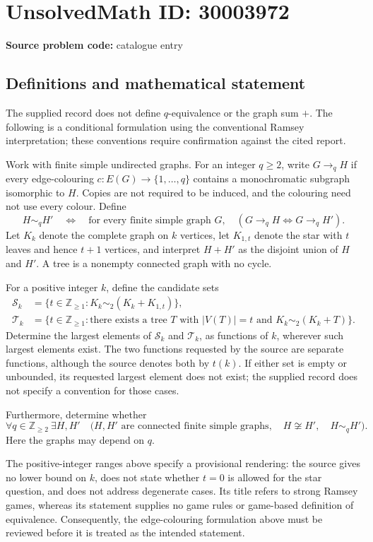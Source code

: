 \documentclass[11pt]{article}
\newcommand{\Z}{\mathbb{Z}}
\begin{document}
\section*{UnsolvedMath ID: 30003972}
\textbf{Source problem code:} catalogue entry
\subsection{Definitions and mathematical statement}
The supplied record does not define \(q\)-equivalence or the graph sum \(+\). The following is a conditional formulation using the conventional Ramsey interpretation; these conventions require confirmation against the cited report.

Work with finite simple undirected graphs. For an integer \(q\ge 2\), write \(G\to_q H\) if every edge-colouring \(c:E(G)\to\{1,\ldots,q\}\) contains a monochromatic subgraph isomorphic to \(H\). Copies are not required to be induced, and the colouring need not use every colour. Define
\[
H\sim_q H'\quad\Longleftrightarrow\quad
\text{for every finite simple graph }G,\quad
(G\to_q H\iff G\to_q H').
\]
Let \(K_k\) denote the complete graph on \(k\) vertices, let \(K_{1,t}\) denote the star with \(t\) leaves and hence \(t+1\) vertices, and interpret \(H+H'\) as the disjoint union of \(H\) and \(H'\). A tree is a nonempty connected graph with no cycle.

For a positive integer \(k\), define the candidate sets
\[
\begin{aligned}
\mathcal S_k&=\{t\in\Z_{\ge1}:K_k\sim_2(K_k+K_{1,t})\},\\
\mathcal T_k&=\{t\in\Z_{\ge1}:\text{there exists a tree }T\text{ with }|V(T)|=t
\text{ and }K_k\sim_2(K_k+T)\}.
\end{aligned}
\]
Determine the largest elements of \(\mathcal S_k\) and \(\mathcal T_k\), as functions of \(k\), wherever such largest elements exist. The two functions requested by the source are separate functions, although the source denotes both by \(t(k)\). If either set is empty or unbounded, its requested largest element does not exist; the supplied record does not specify a convention for those cases.

Furthermore, determine whether
\[
\forall q\in\Z_{\ge2}\ \exists H,H'\quad
\bigl(H,H'\text{ are connected finite simple graphs},\quad
H\not\cong H',\quad H\sim_q H'\bigr).
\]
Here the graphs may depend on \(q\).

The positive-integer ranges above specify a provisional rendering: the source gives no lower bound on \(k\), does not state whether \(t=0\) is allowed for the star question, and does not address degenerate cases. Its title refers to strong Ramsey games, whereas its statement supplies no game rules or game-based definition of equivalence. Consequently, the edge-colouring formulation above must be reviewed before it is treated as the intended statement.
\end{document}
